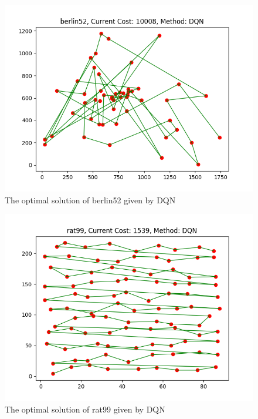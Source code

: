 \documentclass[twocolumn, a4paper]{extarticle}
\begin{document}
\begin{figure}[H]
	\centering
	\includegraphics[width=0.95\linewidth]{figure/DQN_berlin52}
	\caption{The optimal solution of berlin52 given by DQN}
	\label{fig:fireberlin52}
\end{figure}

\begin{figure}[H]
	\centering
	\includegraphics[width=0.95\linewidth]{figure/DQN_rat99}
	\caption{The optimal solution of rat99 given by DQN}
	\label{fig:firerat99}
\end{figure}
\end{document}
